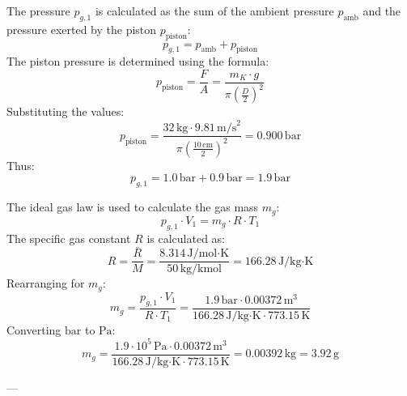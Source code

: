 The pressure \( p_{g,1} \) is calculated as the sum of the ambient pressure \( p_{\text{amb}} \) and the pressure exerted by the piston \( p_{\text{piston}} \):  
\[
p_{g,1} = p_{\text{amb}} + p_{\text{piston}}
\]  
The piston pressure is determined using the formula:  
\[
p_{\text{piston}} = \frac{F}{A} = \frac{m_K \cdot g}{\pi \left(\frac{D}{2}\right)^2}
\]  
Substituting the values:  
\[
p_{\text{piston}} = \frac{32 \, \text{kg} \cdot 9.81 \, \text{m/s}^2}{\pi \left(\frac{10 \, \text{cm}}{2}\right)^2} = 0.900 \, \text{bar}
\]  
Thus:  
\[
p_{g,1} = 1.0 \, \text{bar} + 0.9 \, \text{bar} = 1.9 \, \text{bar}
\]  

The ideal gas law is used to calculate the gas mass \( m_g \):  
\[
p_{g,1} \cdot V_1 = m_g \cdot R \cdot T_1
\]  
The specific gas constant \( R \) is calculated as:  
\[
R = \frac{\bar{R}}{M} = \frac{8.314 \, \text{J/mol·K}}{50 \, \text{kg/kmol}} = 166.28 \, \text{J/kg·K}
\]  
Rearranging for \( m_g \):  
\[
m_g = \frac{p_{g,1} \cdot V_1}{R \cdot T_1} = \frac{1.9 \, \text{bar} \cdot 0.00372 \, \text{m}^3}{166.28 \, \text{J/kg·K} \cdot 773.15 \, \text{K}}
\]  
Converting \( \text{bar} \) to \( \text{Pa} \):  
\[
m_g = \frac{1.9 \cdot 10^5 \, \text{Pa} \cdot 0.00372 \, \text{m}^3}{166.28 \, \text{J/kg·K} \cdot 773.15 \, \text{K}} = 0.00392 \, \text{kg} = 3.92 \, \text{g}
\]  

---